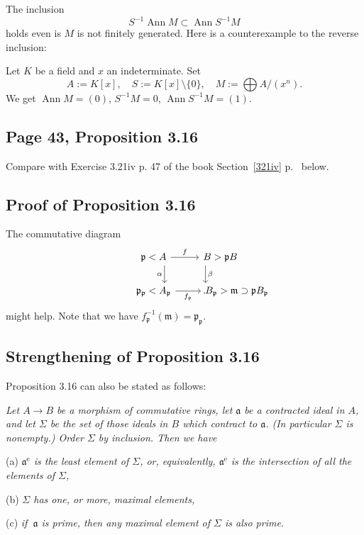 \documentclass[parskip=half,fontsize=12pt]{scrartcl}%
\newcommand{\oo}{\operatorname}\newcommand{\ooo}{\operatorname*}
\newcommand{\mf}{\mathfrak}
\newcommand{\aaa}{\mf a}
\newcommand{\mmm}{\mf m}
\newcommand{\ppp}{\mf p}
\begin{document}
The inclusion 
$$
S^{-1}\oo{Ann}M\subset\oo{Ann}S^{-1}M
$$ 
holds even is $M$ is not finitely generated. Here is a counterexample to the reverse inclusion:

Let $K$ be a field and $x$ an indeterminate. Set 
$$
A:=K[x],\quad S:=K[x]\setminus\{0\},\quad M:=\bigoplus A/(x^n).
$$ 
We get $\oo{Ann}M=(0)$, $S^{-1}M=0$, $\oo{Ann}S^{-1}M=(1)$. 

\subsection{Page 43, Proposition 3.16}%

Compare with Exercise 3.21iv p. 47 of the book Section~\ref{321iv} p.~\pageref{321iv} below.

\subsection{Proof of Proposition 3.16}

The commutative diagram
$$
\begin{tikzcd}
\kern-22pt\ppp<A\ar[d,"\alpha"']\ar[r,"f"]&B>\ppp B\ar[d,"\beta"]\kern-30pt\\ 
\kern-22pt\ppp_\ppp<A_\ppp\ar[r,"f_\ppp"']&B_\ppp>\mmm\supset\ppp B_\ppp\kern-66pt.
\end{tikzcd}
$$ 
might help. Note that we have $f_\ppp^{-1}(\mmm)=\ppp_\ppp$.


\subsection{Strengthening of Proposition 3.16}\label{43}

Proposition 3.16 can also be stated as follows:

\emph{Let $A\to B$ be a morphism of commutative rings, let $\aaa$ be a contracted ideal in $A$, and let $\Sigma$ be the set of those ideals in $B$ which contract to $\aaa$. (In particular $\Sigma$ is nonempty.) Order $\Sigma$ by inclusion. Then we have}

(a) \emph{$\aaa^{\oo e}$ is the least element of $\Sigma$, or, equivalently, $\aaa^{\oo e}$ is the intersection of all the elements of $\Sigma$,}

(b) \emph{$\Sigma$ has one, or more, maximal elements,}

(c) \emph{if $\ \aaa$ is prime, then any maximal element of $\Sigma$ is also prime.}
\end{document}
